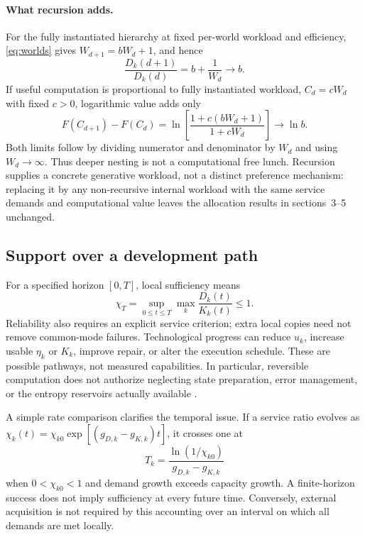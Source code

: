 \paragraph{What recursion adds.}
For the fully instantiated hierarchy at fixed per-world workload and efficiency, \cref{eq:worlds} gives
$W_{d+1}=bW_d+1$, and hence
\begin{equation}
 \frac{D_k(d+1)}{D_k(d)}=b+\frac{1}{W_d}\longrightarrow b.
 \label{eq:recursion-cost}
\end{equation}
If useful computation is proportional to fully instantiated workload,
$C_d=cW_d$ with fixed $c>0$, logarithmic value adds only
\begin{equation}
 F(C_{d+1})-F(C_d)
 =\ln\!\left[\frac{1+c(bW_d+1)}{1+cW_d}\right]
 \longrightarrow\ln b.
 \label{eq:recursion-value}
\end{equation}
Both limits follow by dividing numerator and denominator by $W_d$ and
using $W_d\to\infty$. Thus deeper nesting is not a computational free
lunch. Recursion supplies a concrete generative workload, not a distinct
preference mechanism: replacing it by any non-recursive internal workload
with the same service demands and computational value leaves the allocation
results in sections~3--5 unchanged.

\subsection{Support over a development path}

For a specified horizon $[0,T]$, local sufficiency means
\begin{equation}
 \chi_T=\sup_{0\leq t\leq T}\max_k\frac{D_k(t)}{K_k(t)}\leq1.
 \label{eq:chi}
\end{equation}
Reliability also requires an explicit service criterion; extra local copies need not remove common-mode failures. Technological progress can reduce $u_k$, increase usable $\eta_k$ or $K_k$, improve repair, or alter the execution schedule. These are possible pathways, not measured capabilities. In particular, reversible computation does not authorize neglecting state preparation, error management, or the entropy reservoirs actually available \citep{Bennett1973,BennettHansonRiedel2019}.

A simple rate comparison clarifies the temporal issue. If a service ratio evolves as $\chi_k(t)=\chi_{k0}\exp[(g_{D,k}-g_{K,k})t]$, it crosses one at
\begin{equation}
 T_k=\frac{\ln(1/\chi_{k0})}{g_{D,k}-g_{K,k}}
 \label{eq:crossing}
\end{equation}
when $0<\chi_{k0}<1$ and demand growth exceeds capacity growth. A finite-horizon success does not imply sufficiency at every future time. Conversely, external acquisition is not required by this accounting over an interval on which all demands are met locally.

